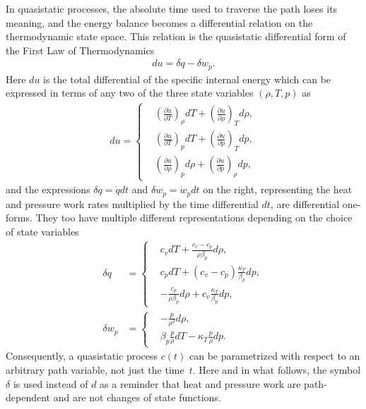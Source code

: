 In quasistatic processes, the absolute time used to traverse the path loses its
meaning, and the energy balance becomes a differential relation on the
thermodynamic state space. This relation is the quasistatic differential form of
the First Law of Thermodynamics
\begin{align}\label{eq:first-law-differential}
    du=\delta q-\delta w_p.
\end{align}
Here $du$ is the total differential of the specific internal energy which can be expressed in terms of any two of the three state variables $(\rho,T,p)$ as
\begin{align}\label{eq:du-presentations}
    du=\left\{\begin{aligned}
        &\left(\frac{\partial u}{\partial T}\right)_{\rho}dT+\left(\frac{\partial u}{\partial \rho}\right)_{T}d\rho,\\
        &\left(\frac{\partial u}{\partial T}\right)_{p}dT+\left(\frac{\partial u}{\partial p}\right)_{T}dp,\\
        &\left(\frac{\partial u}{\partial \rho}\right)_{p}d\rho+\left(\frac{\partial u}{\partial p}\right)_{\rho}dp,
        \end{aligned}\right.
\end{align}
and the expressions $\delta q=\dot{q}dt$ and $\delta w_p=\dot{w}_pdt$ on the right, representing the heat and pressure work rates multiplied by the time differential $dt$, are differential one-forms. They too have multiple different representations depending on the choice of state variables
\begin{align}
    \label{eq:delta-q-representations}
    \delta q&=\left\{\begin{aligned}
    &c_vdT+\frac{c_v-c_p}{\rho\beta_p}d\rho,\\
    &c_pdT+(c_v-c_p)\frac{\kappa_T}{\beta_p}dp,\\
    &-\frac{c_p}{\rho\beta_p}d\rho+c_v\frac{\kappa_T}{\beta_p}dp,\end{aligned}\right.\\
    \label{eq:delta-w_p-representations}
    \delta w_p&=\left\{\begin{aligned}
    &-\frac{p}{\rho^2}d\rho,\\
    &\beta_p\frac{p}{\rho}dT-\kappa_T\frac{p}{\rho}dp.
    \end{aligned}\right.
\end{align}
Consequently, a quasistatic process $c(t)$ can be parametrized with respect to an arbitrary path variable, not just the time~$t$. Here and in what follows, the symbol $\delta$ is used instead of $d$ as a reminder that heat and pressure work
are path-dependent and are not changes of state functions.


